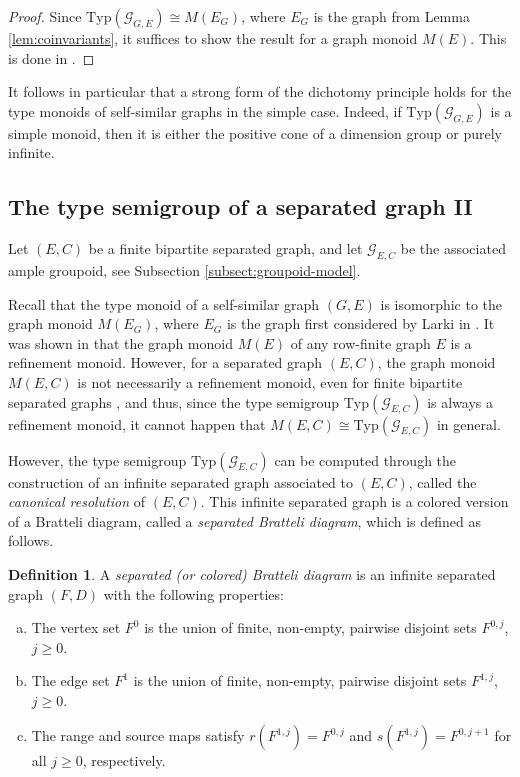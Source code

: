 \documentclass[11pt]{amsart}
\theoremstyle{plain}            %
\theoremstyle{definition}       %
\newtheorem{definition}[theorem]{Definition}
\theoremstyle{definition}       %
\theoremstyle{remark}
\newcommand{\Typ}{\mathrm{Typ}}
\begin{document}
\begin{proof}
Since $\Typ (\mathcal G_{G,E}) \cong M(E_G)$, where $E_G$ is the graph from Lemma \ref{lem:coinvariants}, it suffices to show the result for a graph monoid $M(E)$. This is done in \cite[Theorem 4.1]{ag15}. 
\end{proof}

It follows in particular that a strong form of the dichotomy principle holds for the type monoids of self-similar graphs in the simple case. Indeed, if $\Typ (\mathcal G_{G,E})$ is a simple monoid, then it is either the positive cone of a dimension group or purely infinite. 

\subsection{The type semigroup of a separated graph II}
\label{subsect:type-semig-sparated-graph}

Let $(E,C)$ be a finite bipartite separated graph, and let $\mathcal G _{E,C}$ be the associated ample groupoid, see Subsection \ref{subsect:groupoid-model}. 

Recall that the type monoid of a self-similar graph $(G,E)$ is isomorphic to the graph monoid $M(E_G)$, where $E_G$ is the graph first considered by Larki in \cite{Larki}.
It was shown in \cite[Proposition 4.4]{amp07} that the graph monoid $M(E)$ of any row-finite graph $E$ is a refinement monoid. However, for a separated graph $(E,C)$, the graph monoid $M(E,C)$ is not necessarily a refinement monoid, even for finite bipartite separated graphs \cite{ag12}, and thus, since the type semigroup $\Typ (\mathcal G_{E,C})$ is always a refinement monoid, it cannot happen that $M(E,C)\cong \Typ (\mathcal G_{E,C})$ in general. 

However, the type semigroup $\Typ (\mathcal G _{E,C})$ can be computed through the construction of an infinite separated graph associated to $(E,C)$, called the {\it canonical resolution} of $(E,C)$.
This infinite separated graph is a colored version of a Bratteli diagram, called a {\it separated Bratteli diagram}, which is defined as follows.

\begin{definition}\cite{al18, ac24}\label{def:separated.Bratteli}
	A \textit{separated (or colored) Bratteli diagram} is an infinite separated graph $(F,D)$ with the following properties:
	\begin{enumerate}[(a)]
		\item The vertex set $F^0$ is the union of finite, non-empty, pairwise disjoint sets $F^{0,j}$, $j \ge 0$.
		\item The edge set $F^1$ is the union of finite, non-empty, pairwise disjoint sets $F^{1,j}$, $j\ge 0$.
		\item The range and source maps satisfy $r(F^{1,j})=F^{0,j}$ and $s(F^{1,j})=F^{0,j+1}$ for all $j\ge 0$, respectively.
	\end{enumerate}
\end{definition}
\end{document}

